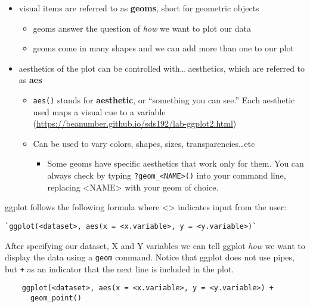 \documentclass[
]{article}
\providecommand{\tightlist}{%
  \setlength{\itemsep}{0pt}\setlength{\parskip}{0pt}}
\begin{document}
\begin{itemize}
\item
  visual items are referred to as \textbf{geoms}, short for geometric
  objects

  \begin{itemize}
  \item
    geoms answer the question of \emph{how} we want to plot our data
  \item
    geoms come in many shapes and we can add more than one to our plot
  \end{itemize}
\item
  aesthetics of the plot can be controlled with\ldots{} aesthetics,
  which are referred to as \textbf{aes}

  \begin{itemize}
  \item
    \texttt{aes()} stands for \textbf{aesthetic}, or ``something you can
    see.'' Each aesthetic used maps a visual cue to a variable
    (\url{https://beanumber.github.io/sds192/lab-ggplot2.html})
  \item
    Can be used to vary colors, shapes, sizes, transparencies\ldots etc

    \begin{itemize}
    \tightlist
    \item
      Some geoms have specific aesthetics that work only for them. You
      can always check by typing
      \texttt{?geom\_\textless{}NAME\textgreater{}()} into your command
      line, replacing \textless NAME\textgreater{} with your geom of
      choice.
    \end{itemize}
  \end{itemize}
\end{itemize}

ggplot follows the following formula where \textless\textgreater{}
indicates input from the user:

\begin{verbatim}
`ggplot(<dataset>, aes(x = <x.variable>, y = <y.variable>)`
\end{verbatim}

After specifying our dataset, X and Y variables we can tell ggplot
\emph{how} we want to display the data using a \texttt{geom} command.
Notice that ggplot does not use pipes, but \texttt{+} as an indicator
that the next line is included in the plot.

\begin{verbatim}
    ggplot(<dataset>, aes(x = <x.variable>, y = <y.variable>) +
      geom_point()
\end{verbatim}
\end{document}

